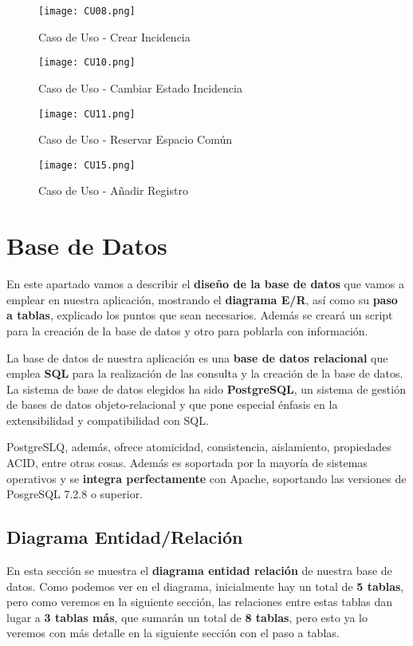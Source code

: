\begin{figure}[H]
	\centering
	\texttt{[image: CU08.png]}
	\caption{Caso de Uso - Crear Incidencia}
\end{figure}

\begin{figure}[H]
	\centering
	\texttt{[image: CU10.png]}
	\caption{Caso de Uso - Cambiar Estado Incidencia}
\end{figure}

\begin{figure}[H]
	\centering
	\texttt{[image: CU11.png]}
	\caption{Caso de Uso - Reservar Espacio Común}
\end{figure}

\begin{figure}[H]
	\centering
	\texttt{[image: CU15.png]}
	\caption{Caso de Uso - Añadir Registro}
\end{figure}


\section{Base de Datos}
En este apartado vamos a describir el \textbf{diseño de la base de datos} que vamos a emplear en nuestra aplicación, mostrando el \textbf{diagrama E/R}, así como su \textbf{paso a tablas}, explicado los puntos que sean necesarios. Además se creará un script para la creación de la base de datos y otro para poblarla con información.

La base de datos de nuestra aplicación es una \textbf{base de datos relacional} que emplea \textbf{SQL} para la realización de las consulta y la creación de la base de datos. La sistema de base de datos elegidos ha sido \textbf{PostgreSQL}, un sistema de gestión de bases de datos objeto-relacional y que pone especial énfasis en la extensibilidad y compatibilidad con SQL. \cite{wiki02}

PostgreSLQ, además, ofrece atomicidad, consistencia, aislamiento, propiedades \gls{ACID}, entre otras cosas. Además es soportada por la mayoría de sistemas operativos y se \textbf{integra perfectamente} con Apache, soportando las versiones de PosgreSQL 7.2.8 o superior. \cite{apache01}

\subsection{Diagrama Entidad/Relación}
En esta sección se muestra el \textbf{diagrama entidad relación} de nuestra base de datos. Como podemos ver en el diagrama, inicialmente hay un total de \textbf{5 tablas}, pero como veremos en la siguiente sección, las relaciones entre estas tablas dan lugar a \textbf{3 tablas más}, que sumarán un total de \textbf{8 tablas}, pero esto ya lo veremos con más detalle en la siguiente sección con el paso a tablas.

